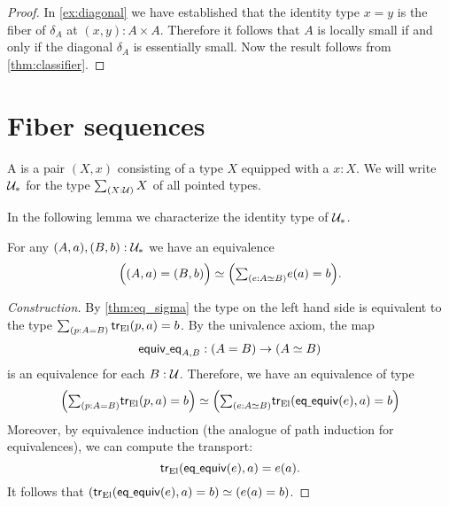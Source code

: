 \begin{proof}
In \cref{ex:diagonal} we have established that the identity type $x=y$ is the fiber of $\delta_A$ at $(x,y):A\times A$. Therefore it follows that $A$ is locally small if and only if the diagonal $\delta_A$ is essentially small.
Now the result follows from \cref{thm:classifier}.
\end{proof}

\section{Fiber sequences}

\begin{defn}
A  is a pair $(X,x)$ consisting of a type $X$ equipped with a  $x:X$. We will write $\mathcal{U}_\ast$ for the type $\sm{X:\UU}X$ of all pointed types.
\end{defn}

In the following lemma we characterize the identity type of $\mathcal{U}_\ast$. 

\begin{lem}\label{lem:equiv_of_ptdtype}
For any $(A,a),(B,b):\mathcal{U}_\ast$ we have an equivalence
\begin{equation*}
\eqv{\Big(\pairr{A,a}=\pairr{B,b}\Big)}{\Big(\sm{e:\eqv{A}{B}}e(a)=b\Big)}.
\end{equation*}
\end{lem}

\begin{proof}[Construction]
By \cref{thm:eq_sigma} the type on the left hand side is
equivalent to the type $\sm{p:A=B}\tr_{\universalfam}({p},{a})=b$.
By the univalence axiom, the map 
\begin{equation*}
\equiveq_{A,B}:(A=B)\to (\eqv{A}{B})
\end{equation*}
is an equivalence for each $B:\mathcal{U}$. 
Therefore, we have an equivalence of type
\begin{equation*}
\eqv{\Big(\sm{p:A=B}\tr_{\universalfam}({p},{a})=b\Big)}{\Big(\sm{e:\eqv{A}{B}}\tr_{\universalfam}({\eqequiv(e)},{a})=b\Big)}
\end{equation*} 
Moreover, by equivalence induction (the analogue of path induction for 
equivalences), we can compute the transport:
\begin{equation*}
\mathsf{tr}_{\mathrm{El}}({\mathsf{eq\underline{\ }{}equiv}(e)},{a})=e(a).
\end{equation*}
It follows that $\eqv{(\tr_{\universalfam}({\eqequiv(e)},{a})=b)}
{(e(a)=b)}$.
\end{proof}

